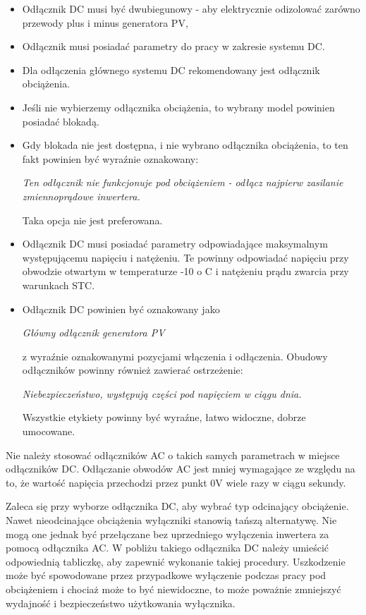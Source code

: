 \documentclass[12pt,a4paper]{article}
\begin{document}
\begin{itemize}
\item Odłącznik DC musi być dwubiegunowy - aby elektrycznie odizolować 
zarówno przewody plus i minus generatora PV, 
\item Odłącznik musi posiadać parametry do pracy w zakresie systemu DC. 
\item Dla odłączenia głównego systemu DC rekomendowany jest odłącznik 
obciążenia. 
\item Jeśli nie wybierzemy odłącznika obciążenia, to wybrany model 
powinien posiadać blokadą. 
\item Gdy blokada nie jest dostępna, i nie wybrano odłącznika 
obciążenia, to ten fakt powinien być wyraźnie oznakowany:
\begin{displayquote} 
\textit{Ten odłącznik nie funkcjonuje pod obciążeniem - odłącz najpierw zasilanie zmiennoprądowe inwertera.}
\end{displayquote} Taka opcja nie jest preferowana. 
\item Odłącznik DC musi posiadać parametry odpowiadające maksymalnym 
występującemu napięciu i natężeniu. Te powinny odpowiadać napięciu przy 
obwodzie otwartym w temperaturze -10 o C i natężeniu prądu zwarcia przy 
warunkach STC. 
\item Odłącznik DC powinien być oznakowany jako 
\begin{displayquote} 
\textit{Główny odłącznik generatora PV}
\end{displayquote}  z wyraźnie oznakowanymi pozycjami włączenia i 
odłączenia. Obudowy odłączników powinny również zawierać ostrzeżenie: 
\begin{displayquote} 
\textit{Niebezpieczeństwo, występują części pod napięciem w ciągu dnia.}
\end{displayquote}  
Wszystkie etykiety powinny być wyraźne, łatwo widoczne, dobrze 
umocowane. 
\end{itemize}
 

Nie należy stosować odłączników AC o takich samych parametrach w miejsce 
odłączników DC. Odłączanie obwodów AC jest mniej wymagające ze względu 
na to, że wartość napięcia przechodzi przez punkt 0V wiele razy w ciągu 
sekundy. 

Zaleca się przy wyborze odłącznika DC, aby wybrać typ odcinający 
obciążenie. Nawet nieodcinające obciążenia wyłączniki stanowią tańszą 
alternatywę. Nie mogą one jednak być przełączane bez uprzedniego 
wyłączenia inwertera za pomocą odłącznika AC. W pobliżu takiego 
odłącznika DC należy umieścić odpowiednią tabliczkę, aby zapewnić 
wykonanie takiej procedury. Uszkodzenie może być spowodowane przez 
przypadkowe wyłączenie podczas pracy pod obciążeniem i chociaż może to 
być niewidoczne, to może poważnie zmniejszyć wydajność i bezpieczeństwo 
użytkowania wyłącznika. 
\end{document}

